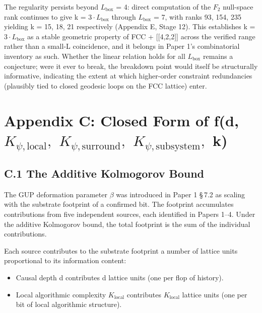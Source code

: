\documentclass[11pt,oneside]{report}
\theoremstyle{definition}
\theoremstyle{remark}
\begin{document}
The regularity persists beyond \ensuremath{L_{\mathrm{box}}} = 4: direct computation of the
\ensuremath{F_{2}} null-space rank continues to give k = \ensuremath{3\cdot L_{\mathrm{box}}} through
\ensuremath{L_{\mathrm{box}}} = 7, with ranks 93, 154, 235 yielding k = 15, 18, 21
respectively (Appendix E, Stage 12). This establishes k = \ensuremath{3\cdot L_{\mathrm{box}}}
as a stable geometric property of FCC + [[4,2,2]] across the verified
range rather than a small-L coincidence, and it belongs in Paper 1's
combinatorial inventory as such. Whether the linear relation holds for
all \ensuremath{L_{\mathrm{box}}} remains a conjecture; were it ever to break, the breakdown
point would itself be structurally informative, indicating the extent at
which higher-order constraint redundancies (plausibly tied to closed
geodesic loops on the FCC lattice) enter.

\section*{Appendix C: Closed Form of f(d, \ensuremath{K_{\psi,\mathrm{local}},} \ensuremath{K_{\psi,\mathrm{surround}},} \ensuremath{K_{\psi,\mathrm{subsystem}},} k)}

\subsection*{C.1 The Additive Kolmogorov Bound}

The GUP deformation parameter \ensuremath{\beta} was introduced in Paper 1 \S\,7.2 as
scaling with the substrate footprint of a confirmed bit. The footprint
accumulates contributions from five independent sources, each identified
in Papers 1--4. Under the additive Kolmogorov bound, the total footprint
is the sum of the individual contributions.

Each source contributes to the substrate footprint a number of lattice
units proportional to its information content:

\begin{itemize}
\item
  Causal depth d contributes d lattice units (one per flop of history).
\end{itemize}

\begin{itemize}
\item
  Local algorithmic complexity \ensuremath{K_{\mathrm{local}}} contributes \ensuremath{K_{\mathrm{local}}} lattice
  units (one per bit of local algorithmic structure).
\end{itemize}
\end{document}
